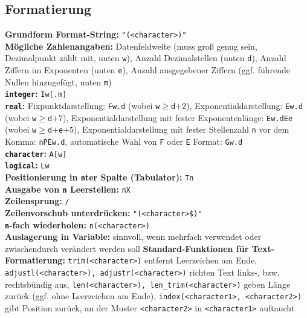 \documentclass[a4paper, twocolumn]{scrarticle}
\begin{document}
\subsection{Formatierung}\label{sec:formatierung}
\textbf{Grundform Format-String:} \lstinline|"(<character>)"|\\
\textbf{Mögliche Zahlenangaben:}  Datenfeldweite (muss groß genug sein, Dezimalpunkt zählt mit, unten \lstinline|w|), Anzahl Dezimalstellen (unten \lstinline|d|), Anzahl Ziffern im Exponenten (unten \lstinline|e|), Anzahl ausgegebener Ziffern (ggf. führende Nullen hinzugefügt, unten \lstinline|m|)\\
\textbf{\lstinline|integer|:} \lstinline|Iw[.m]|\\
\textbf{\lstinline|real|:} Fixpunktdarstellung: \lstinline|Fw.d| (wobei \lstinline|w|$\geq$\lstinline|d|$+2$), Exponentialdarstellung: \lstinline|Ew.d| (wobei \lstinline|w|$\geq$\lstinline|d|$+7$), Exponentialdarstellung mit fester Exponentenlänge: \lstinline|Ew.dEe| (wobei \lstinline|w|$\geq$\lstinline|d|$+$\lstinline|e|$+5$), Exponentialdarstellung mit fester Stellenzahl \lstinline|n| vor dem Komma: \lstinline|nPEw.d|, automatische Wahl von \lstinline|F| oder \lstinline|E| Format: \lstinline|Gw.d|\\
\textbf{\lstinline|character|:} \lstinline|A[w]|\\
\textbf{\lstinline|logical|:} \lstinline|Lw|\\
\textbf{Positionierung in \lstinline|n|ter Spalte (Tabulator):} \lstinline|Tn|\\
\textbf{Ausgabe von \lstinline|n| Leerstellen:} \lstinline|nX|\\
\textbf{Zeilensprung:} \lstinline|/|\\
\textbf{Zeilenvorschub unterdrücken:} \lstinline|"(<character>$)"|\\
\textbf{\lstinline|n|-fach wiederholen:} \lstinline|n(<character>)|\\
\textbf{Auslagerung in Variable:} sinnvoll, wenn mehrfach verwendet oder  zwischendurch verändert werden soll
\textbf{Standard-Funktionen für Text-Formatierung:} \lstinline|trim(<character>)| entfernt Leerzeichen am Ende, \lstinline|adjustl(<character>), adjustr(<character>)| richten Text links-, bzw. rechtsbündig aus, \lstinline|len(<character>), len_trim(<character>)| geben Länge zurück (ggf. ohne Leerzeichen am Ende), \lstinline|index(<character1>, <character2>)| gibt Position zurück, an der Muster \lstinline|<character2>| in \lstinline|<character1>| auftaucht 
\end{document}

